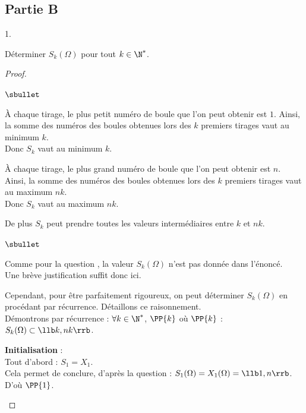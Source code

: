 \documentclass[11pt]{article}%
\begin{document}
\newpage


\subsection*{Partie B}

\begin{noliste}{1.}
  \setcounter{enumi}{4}
\item Déterminer $S_k(\Omega)$ pour tout $k\in\N^*$.
  
  \begin{proof}~
    \begin{noliste}{$\sbullet$}
    \item À chaque tirage, le plus petit numéro de boule que l'on peut
      obtenir est $1$. Ainsi, la somme des numéros des boules
      obtenues lors des $k$ premiers tirages vaut au minimum
      $k$.\\[.2cm] 
      Donc $S_k$ vaut au minimum $k$.
    \item À chaque tirage, le plus grand numéro de boule que l'on peut
      obtenir est $n$. Ainsi, la somme des numéros des boules
      obtenues lors des $k$ premiers tirages vaut au maximum
      $nk$.\\[.2cm] 
      Donc $S_k$ vaut au maximum $nk$.
    \item De plus $S_k$ peut prendre toutes les valeurs intermédiaires
      entre $k$ et $nk$.
    \end{noliste}
    \begin{remark}%
      \begin{noliste}{$\sbullet$}
      \item Comme pour la question , la valeur
        $S_k(\Omega)$ n'est pas donnée dans l'énoncé.\\
        Une brève justification suffit donc ici.
      \item Cependant, pour être parfaitement rigoureux, on peut
        déterminer $S_k(\Omega)$ en procédant par
        récurrence. Détaillons ce raisonnement.\\[.2cm]
        Démontrons par récurrence : $\forall k\in\N^*$, $\PP{k}$ \quad
        où \quad $\PP{k}$ : $S_k(\Omega) \subset \llb k,nk\rrb$.
        \begin{noliste}{\fitem}
        \item {\bf Initialisation} : \\
          Tout d'abord : $S_1=X_1$.\\
          Cela permet de conclure, d'après la question  :
          $S_1(\Omega) = X_1(\Omega) = \llb 1,n\rrb$.\\
          D'où $\PP{1}$.
        

\end{noliste}
\end{noliste}
\end{remark}
\end{proof}
\end{noliste}
\end{document}

